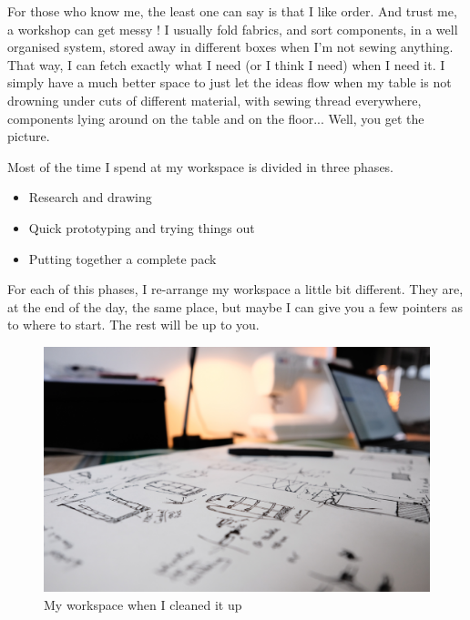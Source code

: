For those who know me, the least one can say is that I like order. And trust me, a workshop can get messy ! I usually fold fabrics, and sort components, in a well organised system, stored away in different boxes when I’m not sewing anything. That way, I can fetch exactly what I need (or I think I need) when I need it. I simply have a much better space to just let the ideas flow when my table is not drowning under cuts of different material, with sewing thread everywhere, components lying around on the table and on the floor... Well, you get the picture.

Most of the time I spend at my workspace is divided in three phases.

\begin{itemize}

  \item Research and drawing
  \item Quick prototyping and trying things out
  \item Putting together a complete pack

\end{itemize}

For each of this phases, I re-arrange my workspace a little bit different. They are, at the end of the day, the same place, but maybe I can give you a few pointers as to where to start. The rest will be up to you.

\begin{figure}
  \includegraphics[width=\textwidth]{media/images/workspace-1}
  \caption{My workspace when I cleaned it up}
  \label{img:workspace-1}
\end{figure}
